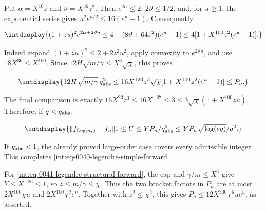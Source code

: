 
Put \(\alpha=X^{10}z\) and \(\vartheta=X^{36}z^2\). Then \(e^{2\alpha}\le2\), \(2\vartheta\le1/2\), and, for \(u\ge1\), the exponential series gives \(u^2e^{u/2}\le16(e^u-1)\). Consequently


\begingroup\renewcommand{\theHequation}{intdisplay.548}
\begin{equation*}
\intdisplay{
(1+zu)^2e^{2\alpha+2\vartheta u}
\le4+(8\vartheta+64z^2)(e^u-1)
\le4[1+X^{100}z^2(e^u-1)].
}
\end{equation*}
\endgroup


Indeed expand \((1+zu)^2\le2+2z^2u^2\), apply convexity to \(e^{2\vartheta u}\), and use \(18X^{36}\le X^{100}\). Since \(12H\sqrt{m/\gamma}\le X^3\sqrt\chi\), this proves


\begingroup\renewcommand{\theHequation}{intdisplay.549}
\begin{equation*}
\intdisplay{
12H\sqrt{m/\gamma}\,q_{\rm abs}^2
\le16X^{123}z^5\sqrt\chi[1+X^{100}z^2(e^u-1)]
\le P_n.
}
\end{equation*}
\endgroup


The final comparison is exactly \(16X^{23}z^3\le16X^{-67}\le3\le 3\sqrt\chi(1+X^{100}zu)\). Therefore, if \(q<q_{\rm abs}\),


\begingroup\renewcommand{\theHequation}{intdisplay.550}
\begin{equation*}
\intdisplay{
\|f_{{\rm Leg},n,q}-f_n\|_*
\le U\le YP_n/q_{\rm abs}^2
\le YP_n\sqrt{\log(eq)}/q^2.
}
\end{equation*}
\endgroup


If \(q_{\rm abs}<1\), the already proved large-order case covers every admissible integer. This completes \eqref{int:eq-0040-legendre-simple-forward}.



For \eqref{int:eq-0041-legendre-structural-forward}, the cap and \(\gamma/m\le X^4\) give \(Y\le X^{-26}\le1\), so \(z\le m/\gamma\le\chi\). Thus the two bracket factors in \(P_n\) are at most \(2X^{100}\chi u\) and \(2X^{100}\chi^2e^u\). Together with \(z^2\le\chi^2\), this gives \(P_n\le12X^{300}\chi^6ue^u\), as asserted.


